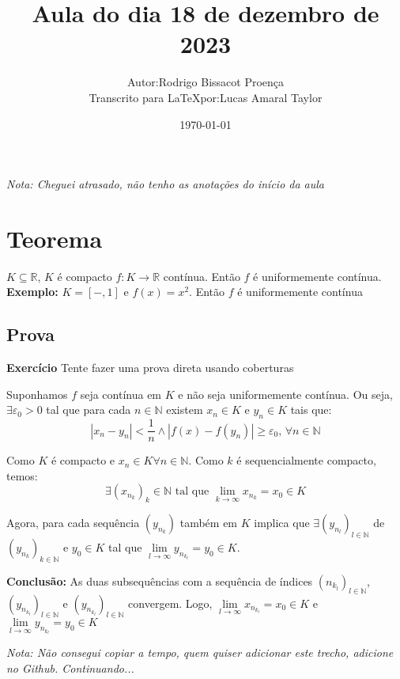 \documentclass[12pt]{article}
\title{Aula do dia 18 de dezembro de 2023}
\author{
    \begin{tabular}{rl}
        Autor: & Rodrigo Bissacot Proença \\
        Transcrito para \LaTeX por: & Lucas Amaral Taylor
    \end{tabular}
}
\date{\today}
\begin{document}
    \maketitle
    \textit{Nota: Cheguei atrasado, não tenho as anotações do início da aula}
    
    \section*{Teorema}
    $K \subseteq \mathbb{R}$, $K$ é compacto $f: K \to \mathbb{R}$ contínua. Então $f$ é uniformemente contínua.
    \textbf{Exemplo:} $K = [-,1]$ e $f(x) = x^2$. Então $f$ é uniformemente contínua

    \subsection*{Prova}
    \textbf{Exercício} Tente fazer uma prova direta usando coberturas 

    Suponhamos $f$ seja contínua em $K$ e não seja uniformemente contínua. Ou seja, $\exists \varepsilon_0 > 0$ tal que para cada $n \in \mathbb{N}$ existem $x_n \in K$ e $y_n \in K$ tais que:
    \begin{equation*}
        |x_n - y_n| < \frac{1}{n} \land |f(x) - f(y_n)| \geq \varepsilon_0 \text{, } \forall n \in \mathbb{N}
    \end{equation*}

    Como $K$ é compacto e $x_n \in K \forall n \in \mathbb{N}$. Como $k$ é sequencialmente compacto, temos:
    \begin{equation*}
        \exists \left(x_{n_k}\right)_k \in \mathbb{N} \text{ tal que } \lim \limits_{k \to \infty} x_{n_k} = x_0 \in K
    \end{equation*}

    Agora, para cada sequência $\left(y_{n_k}\right)$ também em $K$ implica que $\exists \left( y_{n_l}\right)_{l \in \mathbb{N}}$ de $\left(y_{n_k} \right)_{k \in \mathbb{N}}$ e $y_0 \in K$ tal que $\lim \limits_{l \to \infty} y_{n_{k_l}} = y_0 \in K$. 

    \textbf{Conclusão: } As duas subsequências com a sequência de índices $\left(n_{k_l}\right)_{l \in \mathbb{N}}$, $\left(y_{n_{k_l}}\right)_{l \in \mathbb{N}}$ e $\left(y_{n_{k_l}} \right)_{l \in \mathbb{N}}$ convergem. Logo, $\lim \limits_{l \to \infty} x_{n_{k_l}} = x_0 \in K$ e $\lim \limits_{l \to \infty} y_{n_{k_l}} = y_0 \in K$

    \textit{Nota: Não consegui copiar a tempo, quem quiser adicionar este trecho, adicione no Github. Continuando...}
\end{document}
